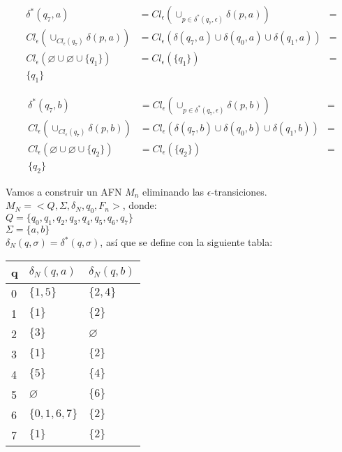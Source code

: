 \documentclass{article}
\begin{document}
\begin{enumerate}
{\begin{enumerate}
{					\begin{align*}
					\delta^{*} (q_{7},a)&=
					Cl_{\epsilon} (\cup_{p \in \delta^{*} (q_{7}, \epsilon)}	\delta (p,a)) &=\\
					Cl_{\epsilon} (\cup_{Cl_{\epsilon} (q_{7})}	\delta (p,a)) &=
					Cl_{\epsilon} ( \delta(q_{7},a) \cup \delta(q_{0},a) \cup \delta(q_{1},a)) &=\\
					Cl_{\epsilon} (\varnothing \cup \varnothing \cup \{q_{1}\}) &=
					Cl_{\epsilon} (\{q_{1}\}) &=\\
					\{q_{1}\}
					\end{align*}
					
					\begin{align*}
					\delta^{*} (q_{7},b)&=
					Cl_{\epsilon} (\cup_{p \in \delta^{*} (q_{7}, \epsilon)}	\delta (p,b)) &=\\
					Cl_{\epsilon} (\cup_{Cl_{\epsilon} (q_{7})}	\delta (p,b)) &=
					Cl_{\epsilon} ( \delta(q_{7},b) \cup \delta(q_{0},b) \cup \delta(q_{1},b)) &=\\
					Cl_{\epsilon} ( \varnothing \cup \varnothing \cup \{q_{2}\}) &=
					Cl_{\epsilon} (\{q_{2}\}) &=\\
					\{q_{2}\}
					\end{align*}
					
			Vamos a construir un AFN $M_{n}$ eliminando las $\epsilon$-transiciones.\\
			
			$M_{N} = <Q, \Sigma, \delta_{N}, q_{0}, F_{n}>$, donde:\\
			
			$Q = \{q_{0}, q_{1}, q_{2}, q_{3}, q_{4}, q_{5}, q_{6}, q_{7}\}$\\
			$\Sigma = \{a, b\}$\\
			$\delta_{N}(q, \sigma) = \delta^*(q, \sigma)$, así que se define con la siguiente tabla:\\
			 
			 \begin{table}[H]
			 	\centering
			 	\begin{tabular}{|l|l|l|}
			 		\hline
			 		q & $\delta_{N} (q,a)$ & $\delta_{N} (q,b)$ \\ \hline
			 		0 & $\{1, 5\}$         & $\{2, 4\}$         \\ \hline
			 		1 & $\{1\}$            & $\{2\}$            \\ \hline
			 		2 & $\{3\}$            & $\varnothing$      \\ \hline
			 		3 & $\{1\}$            & $\{2\}$            \\ \hline
			 		4 & $\{5\}$            & $\{4\}$            \\ \hline
			 		5 & $\varnothing$      & $\{6\}$            \\ \hline
			 		6 & $\{0, 1, 6, 7\}$   & $\{2\}$            \\ \hline
			 		7 & $\{1\}$            & $\{2\}$            \\ \hline
			 	\end{tabular}
			 \end{table}
			 
}
\end{enumerate}}
\end{enumerate}
\end{document}
